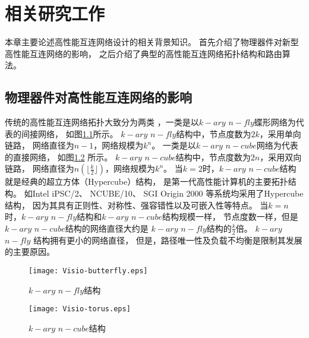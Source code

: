 \chapter{相关研究工作}
本章主要论述高性能互连网络设计的相关背景知识。
首先介绍了物理器件对新型高性能互连网络的影响，
之后介绍了典型的高性能互连网络拓扑结构和路由算法。

\section{物理器件对高性能互连网络的影响}
传统的高性能互连网络拓扑大致分为两类
，一类是以$k-ary$ $n-fly$蝶形网络为代表的间接网络，
如图\ref{butterfly}所示。
$k-ary$ $n-fly$结构中，节点度数为$2k$，采用单向链路，
网络直径为$n-1$，网络规模为$k^n$。
一类是以$k-ary$ $n-cube$网络为代表的直接网络，
如图\ref{torus} 所示。
$k-ary$ $n-cube$结构中，节点度数为$2n$，采用双向链路，
网络直径为$n(\lfloor\frac{k}{2}\rfloor)$，网络规模为$k^n$。
当$k=2$时，$k-ary$ $n-cube$结构就是经典的超立方体（Hypercube）结构，
是第一代高性能计算机的主要拓扑结构。
如Intel iPSC/2、 NCUBE/10、
SGI Origin 2000 等系统均采用了Hypercube结构，
因为其具有正则性、对称性、强容错性以及可嵌入性等特点。
当$k=n$时，$k-ary$ $n-fly$结构和$k-ary$ $n-cube$结构规模一样，
节点度数一样，但是$k-ary$ $n-cube$结构的网络直径大约是
$k-ary$ $n-fly$结构的$\frac{k}{2}$倍。
$k-ary$ $n-fly$ 结构拥有更小的网络直径，
但是，路径唯一性及负载不均衡是限制其发展的主要原因。

\begin{figure}[htp]
  \centering
   \texttt{[image: Visio-butterfly.eps]}
    \caption{$k-ary$ $n-fly$结构}
    \label{butterfly}
\end{figure}

\begin{figure}[htp]
  \centering
   \texttt{[image: Visio-torus.eps]}
      \caption{$k-ary$ $n-cube$结构}
      \label{torus}
\end{figure}

